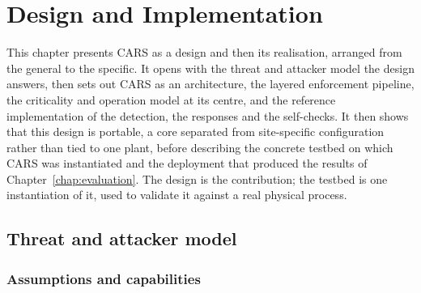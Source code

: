 \chapter{Design and Implementation}
\label{chap:execution}

\noindent
This chapter presents CARS as a design and then its realisation, arranged from the general to the specific. It opens with the threat and attacker model the design answers, then sets out CARS as an architecture, the layered enforcement pipeline, the criticality and operation model at its centre, and the reference implementation of the detection, the responses and the self-checks. It then shows that this design is portable, a core separated from site-specific configuration rather than tied to one plant, before describing the concrete testbed on which CARS was instantiated and the deployment that produced the results of Chapter~\ref{chap:evaluation}. The design is the contribution; the testbed is one instantiation of it, used to validate it against a real physical process.

\section{Threat and attacker model}
\label{sec:threat}

\subsection{Assumptions and capabilities}


